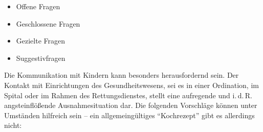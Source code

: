 {
\begin{itemize}
    \item Offene Fragen
    \item Geschlossene Fragen
    \item Gezielte Fragen
    \item Suggestivfragen 
\end{itemize}
}{}{}{}

{Die Kommunikation mit Kindern kann besonders herausfordernd
sein. Der Kontakt mit Einrichtungen des Gesundheitswesens,
sei es in einer Ordination, im Spital oder im Rahmen des
Rettungsdienstes, stellt eine aufregende und i.\,d.\,R.
angsteinflößende Ausnahmesituation dar. Die folgenden
Vorschläge können unter Umständen hilfreich sein -- ein
allgemeingültiges \enquote{Kochrezept} gibt es allerdings nicht:

}
